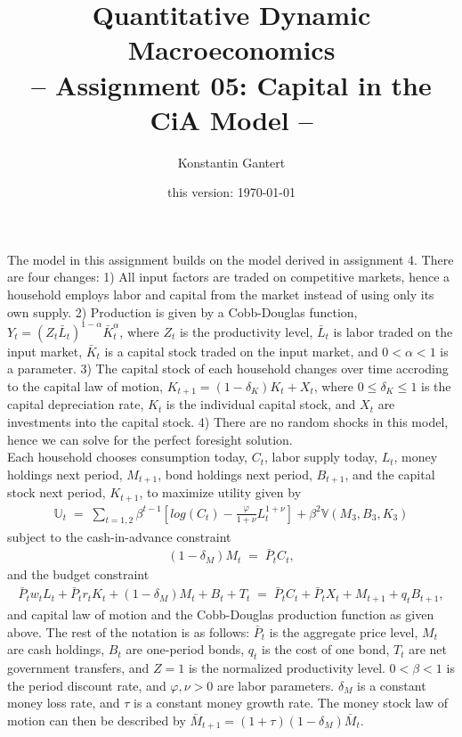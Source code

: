 \documentclass[a4paper, 12pt]{article}
\title{Quantitative Dynamic Macroeconomics \vspace{0.1in} \\ \large{-- Assignment 05: Capital in the CiA Model  --}}
\author{\small{Konstantin Gantert}}
\date{\small{this version: \today}}
\begin{document}
%
\clearpage\maketitle%
The model in this assignment builds on the model derived in assignment 4. There are four changes: 1) All input factors are traded on competitive markets, hence a household employs labor and capital from the market instead of using only its own supply. 2) Production is given by a Cobb-Douglas function, $Y_t = \left(Z_t \bar{L}_t\right)^{1-\alpha} \bar{K}_t^{\alpha}$, where $Z_t$ is the productivity level, $\bar{L}_t$ is labor traded on the input market, $\bar{K}_t$ is a capital stock traded on the input market, and $0<\alpha<1$ is a parameter. 3) The capital stock of each household changes over time accroding to the capital law of motion, $K_{t+1} = (1-\delta_K) K_t + X_t$, where $0 \leq\delta_K\leq 1$ is the capital depreciation rate, $K_t$ is the individual capital stock, and $X_t$ are investments into the capital stock. 4) There are no random shocks in this model, hence we can solve for the perfect foresight solution.\\%
Each household chooses consumption today, $C_t$, labor supply today, $L_t$, money holdings next period, $M_{t+1}$, bond holdings next period, $B_{t+1}$, and the capital stock next period, $K_{t+1}$, to maximize utility given by%
\begin{align*}%
	\mathbb{U}_t \; = \; \sum_{t=1,2} \beta^{t-1} \left[log(C_t)-\frac{\varphi}{1+\nu} L_t^{1+\nu}\right] + \beta^2 \mathbb{V} \left(M_3,B_3,K_3\right)%
\end{align*}%
subject to the cash-in-advance constraint%
\begin{align*}%
	\left(1-\delta_M\right) M_t \; = \; \bar{P}_t C_t,%
\end{align*}%
and the budget constraint%
\begin{align*}%
	\bar{P}_t w_t L_t + \bar{P}_t r_t K_t + \left(1-\delta_M\right) M_t + B_t + T_t \; = \; \bar{P}_t C_t + \bar{P}_t X_t + M_{t+1} + q_t B_{t+1},%
\end{align*}%
and capital law of motion and the Cobb-Douglas production function as given above. The rest of the notation is as follows: $\bar{P}_t$ is the aggregate price level, $M_t$ are cash holdings, $B_t$ are one-period bonds, $q_t$ is the cost of one bond, $T_t$ are net government transfers,  and $Z=1$ is the normalized productivity level. $0<\beta<1$ is the period discount rate, and $\varphi, \nu > 0$ are labor parameters. $\delta_M$ is a constant money loss rate, and $\tau$ is a constant money growth rate. The money stock law of motion can then be described by $\bar{M}_{t+1} = (1+\tau)(1-\delta_M) \bar{M}_t$.\\%
\end{document}
